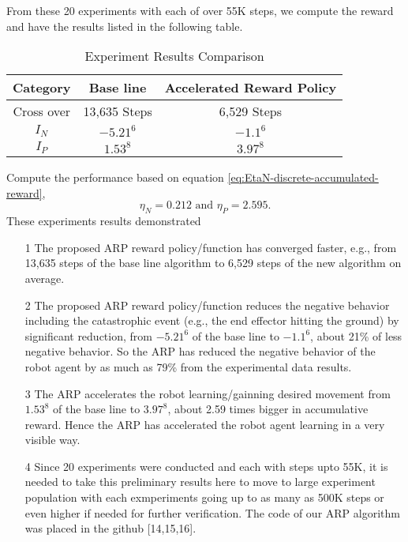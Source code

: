 \documentclass[conference]{IEEEtran}
\begin{document}
From these 20 experiments with each of over 55K steps, 
we compute the reward and have the results listed in the 
following table. 
\begin{table}[H] %
\renewcommand{\arraystretch}{1.3} 
\caption{Experiment Results Comparison}
\label{Table1 Experiment Results Comparison}
\centering 
\begin{tabular}{|c||c||c|}
\hline
\hline 
Category     & Base line     & Accelerated Reward Policy    \\
\hline
Cross over   & 13,635 Steps & 6,529 Steps  \\
\hline
$I_N$  & $-5.21^{6}$ & $-1.1^{6}$ \\
\hline 
$I_P$  & $1.53^{8}$ & $3.97^{8}$ \\
\hline 
\hline 
\end{tabular}
\end{table}
Compute the performance based on equation 
\ref{eq:EtaN-discrete-accumulated-reward}, 
\begin{equation}
\eta_N = 0.212 \text{  and    } \eta_P = 2.595 . 
\end{equation}
These experiments results demonstrated 
\begin{itemize}
\item[1] The proposed ARP reward policy/function 
has converged faster, e.g., from 13,635 steps of the 
base line algorithm to 6,529 steps of the new 
algorithm on average. 
\item[2] The proposed ARP reward policy/function 
reduces the negative behavior including the catastrophic 
event (e.g., the end effector hitting the ground)
by significant reduction, from $-5.21^{6}$ of the base line 
to $-1.1^{6}$, about 21\% of less negative behavior. 
So the ARP has reduced the negative behavior of the 
robot agent by as much as 79\% from the experimental 
data results. 
\item[3] The ARP 
accelerates the robot learning/gainning desired 
movement from $1.53^{8}$ of the base line 
to $3.97^{8}$, about 2.59 times bigger in 
accumulative reward. 
Hence the ARP has accelerated the 
robot agent learning in a very visible way. 
\item[4] Since 20 experiments were conducted and each with 
steps upto 55K, it is needed to take this preliminary
results here to move to large experiment population with
each exmperiments going up to as many as 500K steps or 
even higher if needed for further verification. 
The code of our ARP algorithm was placed in the 
github [14,15,16]. 
\end{itemize}
\end{document}
